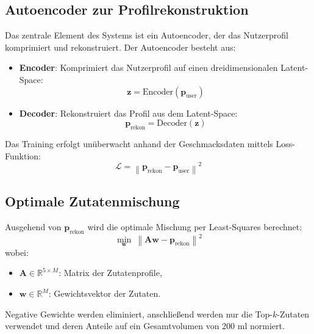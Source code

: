 \documentclass[12pt, a4paper]{report}
\begin{document}
\subsection*{Autoencoder zur Profilrekonstruktion}
Das zentrale Element des Systems ist ein Autoencoder, der das Nutzerprofil komprimiert und rekonstruiert. Der Autoencoder besteht aus:
\begin{itemize}
  \item \textbf{Encoder}: Komprimiert das Nutzerprofil auf einen dreidimensionalen Latent-Space:
    \[\mathbf{z} = \text{Encoder}(\mathbf{p}_{\text{user}})\]
  \item \textbf{Decoder}: Rekonstruiert das Profil aus dem Latent-Space:
    \[\mathbf{p}_{\text{rekon}} = \text{Decoder}(\mathbf{z})\]
\end{itemize}
Das Training erfolgt unüberwacht anhand der Geschmacksdaten mittels Loss-Funktion:
\[\mathcal{L} = \left\lVert \mathbf{p}_{\text{rekon}} - \mathbf{p}_{\text{user}} \right\rVert^2\]

\subsection*{Optimale Zutatenmischung}
Ausgehend von \( \mathbf{p}_{\text{rekon}} \) wird die optimale Mischung per Least-Squares berechnet:
\[\min_{\mathbf{w}} \ \left\lVert \mathbf{A}\mathbf{w} - \mathbf{p}_{\text{rekon}} \right\rVert^2\]
wobei:
\begin{itemize}
  \item \(\mathbf{A} \in \mathbb{R}^{5 \times M}\): Matrix der Zutatenprofile,
  \item \(\mathbf{w}\in \mathbb{R}^M\): Gewichtsvektor der Zutaten.
\end{itemize}
Negative Gewichte werden eliminiert, anschließend werden nur die Top-\(k\)-Zutaten verwendet und deren Anteile auf ein Gesamtvolumen von 200 ml normiert.
\end{document}
